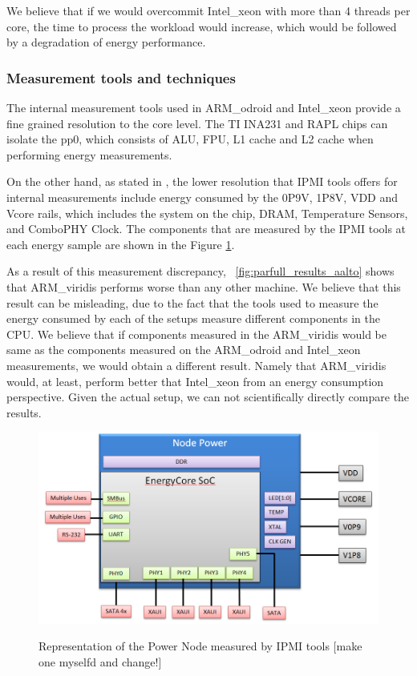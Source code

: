 We believe that if we would overcommit Intel\_xeon with more than 4 threads per core, the time to process the workload would increase, which would be followed by a degradation of energy performance.

\subsubsection*{Measurement tools and techniques}

The internal measurement tools used in ARM\_odroid and Intel\_xeon provide a fine grained resolution to the core level. The TI INA231 and RAPL chips can isolate the pp0, which consists of ALU, FPU, L1 cache and L2 cache when performing energy measurements. 

On the other hand, as stated in \cite{IPMI_resolution}, the lower resolution that IPMI tools offers for internal measurements include energy consumed by the 0P9V, 1P8V, VDD and Vcore rails, which includes the system on the chip, DRAM, Temperature Sensors, and ComboPHY Clock. The components that are measured by the IPMI tools at each energy sample are shown in the Figure \ref{fig:power_node_ipmitool}.

As a result of this measurement discrepancy, ~\ref{fig:parfull_results_aalto} shows that ARM\_viridis performs worse than any other machine. We believe that this result can be misleading, due to the fact that the tools used to measure the energy consumed by each of the setups measure different components in the CPU. We believe that if components measured in the ARM\_viridis would be same as the components measured on the ARM\_odroid and Intel\_xeon measurements, we would obtain a different result. Namely that ARM\_viridis would, at least, perform better that Intel\_xeon from an energy consumption perspective. Given the actual setup, we can not scientifically directly compare the results.

\begin{figure}[h!]
  \centering
    \includegraphics[width=150mm]{"img/aalto/power_node_ipmitool"}
    \label{fig:power_node_ipmitool}
    \caption{Representation of the Power Node measured by IPMI tools [make one myselfd and change!]}
\end{figure}


